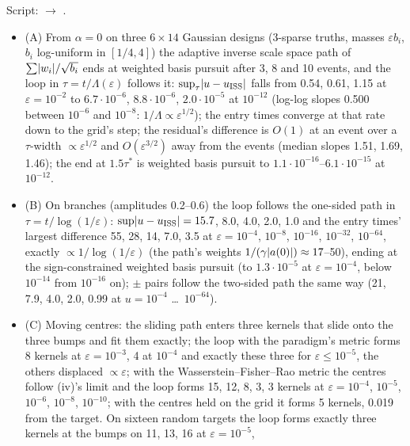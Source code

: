 Script:  $\to$ .
\begin{itemize}
  \item (A) From $\alpha = 0$ on three $6\times14$ Gaussian designs (3-sparse truths, masses $\varepsilon b_i$, $b_i$
    log-uniform in $[1/4,4]$) the adaptive inverse scale space path of $\sum\lvert w_i\rvert/\sqrt{b_i}$ ends at weighted basis
    pursuit after 3, 8 and 10 events, and the loop in $\tau = t/\Lambda(\varepsilon)$ follows it:
    $\sup_\tau\lvert u - u_{\mathrm{ISS}}\rvert$ falls from 0.54, 0.61, 1.15 at $\varepsilon = 10^{-2}$ to $6.7\cdot10^{-6}$,
    $8.8\cdot10^{-6}$, $2.0\cdot10^{-5}$ at $10^{-12}$ (log-log slopes 0.500 between $10^{-6}$ and $10^{-8}$:
    $1/\Lambda\propto\varepsilon^{1/2}$); the entry times converge at that rate down to the grid's step; the residual's
    difference is $O(1)$ at an event over a $\tau$-width $\propto\varepsilon^{1/2}$ and $O(\varepsilon^{3/2})$ away from
    the events (median slopes 1.51, 1.69, 1.46); the end at $1.5\tau^*$ is weighted basis pursuit to
    $1.1\cdot10^{-16}$--$6.1\cdot10^{-15}$ at $10^{-12}$.
  \item (B) On branches (amplitudes 0.2--0.6) the loop follows the one-sided path in $\tau = t/\log(1/\varepsilon)$:
    $\sup\lvert u - u_{\mathrm{ISS}}\rvert = 15.7$, 8.0, 4.0, 2.0, 1.0 and the entry times' largest difference 55, 28, 14, 7.0,
    3.5 at $\varepsilon = 10^{-4}$, $10^{-8}$, $10^{-16}$, $10^{-32}$, $10^{-64}$, exactly
    $\propto1/\log(1/\varepsilon)$ (the path's weights $1/(\gamma\lvert a(0)\rvert)\approx17$--50), ending at the
    sign-constrained weighted basis pursuit (to $1.3\cdot10^{-5}$ at $\varepsilon = 10^{-4}$, below $10^{-14}$ from
    $10^{-16}$ on); $\pm$ pairs follow the two-sided path the same way (21, 7.9, 4.0, 2.0, 0.99 at $u = 10^{-4}$ \dots\
    $10^{-64}$).
  \item (C) Moving centres: the sliding path enters three kernels that slide onto the three bumps and fit them exactly;
    the loop with the paradigm's metric forms 8 kernels at $\varepsilon = 10^{-3}$, 4 at $10^{-4}$ and exactly these
    three for $\varepsilon\le10^{-5}$, the others displaced $\propto\varepsilon$; with the Wasserstein--Fisher--Rao metric
    the centres follow (iv)'s limit and the loop forms 15, 12, 8, 3, 3 kernels at $\varepsilon = 10^{-4}$, $10^{-5}$,
    $10^{-6}$, $10^{-8}$, $10^{-10}$; with the centres held on the grid it forms 5 kernels, 0.019 from the target. On
    sixteen random targets the loop forms exactly three kernels at the bumps on 11, 13, 16 at $\varepsilon = 10^{-5}$,

\end{itemize}
